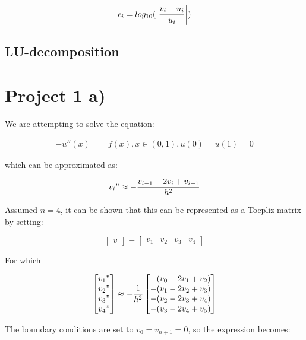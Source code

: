 \documentclass{article}
\begin{document}
\begin{equation}
	\epsilon_i = log_{10}(\abs{\frac{v_i -u_i}{u_i}})
	\label{eq:re}
\end{equation}

\subsection{LU-decomposition}



\section{Project 1 a)}

We are attempting to solve the equation: 

\begin{align*}
	-u''(x) & = f(x), x \in (0, 1), u(0) = u(1) = 0
\end{align*}

which can be approximated as:

\begin{equation}
	v_i" \approx -\frac{v_{i-1}- 2v_i + v_{i+1}}{h^2}
\end{equation}

Assumed $n= 4$, it can be shown that this can be represented as a Toepliz-matrix by setting: 

\[
\begin{bmatrix}
	v
\end{bmatrix}
=
\begin{bmatrix}
	 v_1 & v_2 & v_3 & v_4
\end{bmatrix}
\]

For which 

\[
\begin{bmatrix}
	v_1" \\  v_2" \\ v_3" \\ v_4"
\end{bmatrix}
	\approx -\frac{1}{h^2}
\begin{bmatrix}
	-(v_{0} -2v_1 +v_2) \\
	-(v_1 -2v_2 +v_3) \\
	-(v_{2} -2v_3 +v_4) \\
	-(v_{3} -2v_4 +v_5) 
\end{bmatrix}
\]

The boundary conditions are set to $v_0 = v_{n+1} = 0$, so the expression becomes: 
\end{document}
